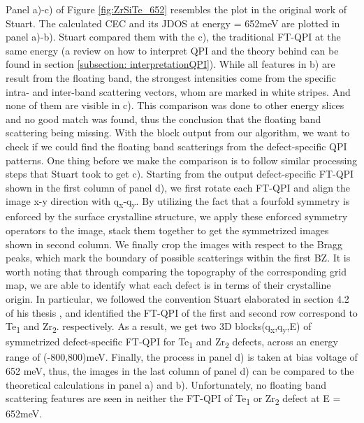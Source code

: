 Panel a)-c) of Figure \ref{fig:ZrSiTe_652} resembles the plot in the original work of Stuart\cite{stuartScanningTunnellingMicroscopy2021}. The calculated \ac{CEC} and its \ac{JDOS} at energy = 652meV are plotted in panel a)-b). Stuart compared them with the c), the traditional FT-QPI at the same energy (a review on how to interpret QPI and the theory behind can be found in section \ref{subsection: interpretationQPI}). While all features in b) are result from the floating band, the strongest intensities come from the specific intra- and inter-band scattering vectors, whom are marked in white stripes. And none of them are visible in c). This comparison was done to other energy slices and no good match was found, thus the conclusion that the floating band scattering being missing. With the block output from our algorithm, we want to check if we could find the floating band scatterings from the defect-specific QPI patterns. One thing before we make the comparison is to follow similar processing steps that Stuart took to get c). Starting from the output defect-specific FT-QPI shown in the first column of panel d), we first rotate each FT-QPI and align the image x-y direction with q\textsubscript{x}-q\textsubscript{y}. By utilizing the fact that a fourfold symmetry is enforced by the surface crystalline structure, we apply these enforced symmetry operators to the image, stack them together to get the symmetrized images shown in second column. We finally crop the images with respect to the Bragg peaks, which mark the boundary of possible scatterings within the first \ac{BZ}. It is worth noting that through comparing the topography of the corresponding grid map, we are able to identify what each defect is in terms of their crystalline origin. In particular, we followed the convention Stuart elaborated in section 4.2 of his thesis \cite{stuartScanningTunnellingMicroscopy2021}, and identified the FT-QPI of the first and second row correspond to Te\textsubscript{1} and Zr\textsubscript{2}. respectively. As a result, we get two 3D blocks(q\textsubscript{x},q\textsubscript{y},E) of symmetrized defect-specific FT-QPI for Te\textsubscript{1} and Zr\textsubscript{2} defects, across an energy range of (-800,800)meV. Finally, the process in panel d) is taken at bias voltage of 652 meV, thus, the images in the last column of panel d) can be compared to the theoretical calculations in panel a) and b). Unfortunately, no floating band scattering features are seen in neither the FT-QPI of Te\textsubscript{1} or Zr\textsubscript{2} defect at E = 652meV. 


